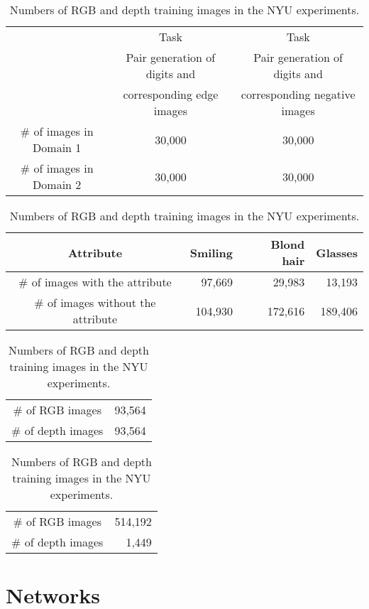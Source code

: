 \documentclass{article}
\begin{document}
\begin{table}[tbh!]
\centering
{ 
\caption{Numbers of training images in Domain 1 and Domain 2 in the MNIST experiments.}
\label{tbl::dataset_digit_count}
\begin{tabular}{ccc}
\hline
 & Task  						 & Task  \\
 & Pair generation of digits and & Pair generation of digits and \\
 & corresponding edge images     & corresponding negative images\\ 
\hline
\# of images in Domain 1 & 30,000 & 30,000 \\
\# of images in Domain 2 & 30,000 & 30,000 \\
\hline
\end{tabular}}
\centering
{ 
\vspace{4mm}
\caption{Numbers of training images of different attributes in the pair face generation experiments.}
\label{tbl::dataset_attr_count}
\begin{tabular}{crrr}
\hline
Attribute & Smiling & Blond hair & Glasses\\
\hline
\# of images with the attribute & 97,669 & 29,983 & 13,193\\
\# of images without the attribute & 104,930  & 172,616 & 189,406\\
\hline
\end{tabular}}
\centering
{ 
\vspace{4mm}
\caption{Numbers of RGB and depth training images in the RGBD experiments.}
\label{tbl::dataset_rgbd_count}
\begin{tabular}{cc}
\hline
\# of RGB images   & 93,564 \\
\# of depth images & 93,564 \\
\hline
\end{tabular}}
\centering
{ 
\vspace{4mm}
\caption{Numbers of RGB and depth training images in the NYU experiments.}
\label{tbl::dataset_nyu_count}
\begin{tabular}{cr}
\hline
\# of RGB images   & 514,192 \\
\# of depth images & 1,449 \\
\hline
\end{tabular}}
\end{table}
 
\section{Networks}\label{subsec::nets}
\end{document}
